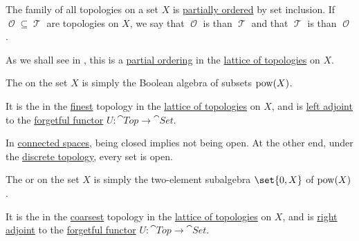 \begin{definition}\label{def:topology_ordering}
  The family of all topologies on a set \( X \) is \hyperref[def:partially_ordered_set]{partially ordered} by set inclusion. If \( \mscrO \subseteq \mscrT \) are topologies on \( X \), we say that \( \mscrO \) is  than \( \mscrT \) and that \( \mscrT \) is  than \( \mscrO \).
\end{definition}
\begin{comments}
  \item As we shall see in , this is a \hyperref[def:partially_ordered_set]{partial ordering} in the \hyperref[thm:lattice_of_topologies]{lattice of topologies} on \( X \).
\end{comments}

\begin{definition}\label{def:discrete_topology}
  The  on the set \( X \) is simply the Boolean algebra of subsets \( \operatorname{pow}(X) \).
\end{definition}
\begin{comments}
  \item It is the in the \hyperref[def:topology_ordering]{finest} topology in the \hyperref[thm:lattice_of_topologies]{lattice of topologies} on \( X \), and is \hyperref[def:category_adjunction]{left adjoint} to the \hyperref[def:concrete_category]{forgetful functor} \( U: \cat{Top} \to \cat{Set} \).

  \item In \hyperref[def:connected_space]{connected spaces}, being closed implies not being open. At the other end, under the \hyperref[def:discrete_topology]{discrete topology}, every set is open.
\end{comments}

\begin{definition}\label{def:indiscrete_topology}
  The  or  on the set \( X \) is simply the two-element subalgebra \( \set{ 0, X } \) of \( \operatorname{pow}(X) \).
\end{definition}
\begin{comments}
  \item It is the in the \hyperref[def:topology_ordering]{coarsest} topology in the \hyperref[thm:lattice_of_topologies]{lattice of topologies} on \( X \), and is \hyperref[def:category_adjunction]{right adjoint} to the \hyperref[def:concrete_category]{forgetful functor} \( U: \cat{Top} \to \cat{Set} \).
\end{comments}

